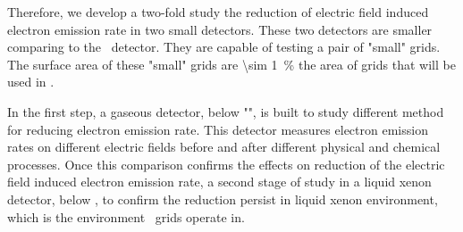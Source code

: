Therefore, we develop a two-fold study the reduction of electric field induced electron emission rate in two small detectors. These two detectors are smaller comparing to the \lze\ detector. They are capable of testing a pair of "small" grids. The surface area of these "small" grids are \SI{\sim 1}{\percent} the area of grids that will be used in \lze . 

In the first step, a gaseous detector, below "\gtest ", is built to study different method for reducing electron emission rate. This detector measures electron emission rates on different electric fields before and after different physical and chemical processes. Once this comparison confirms the effects on reduction of the electric field induced electron emission rate, a second stage of study in a liquid xenon detector, below \phaseone , to confirm the reduction persist in liquid xenon environment, which is the environment \lze\ grids operate in. 





